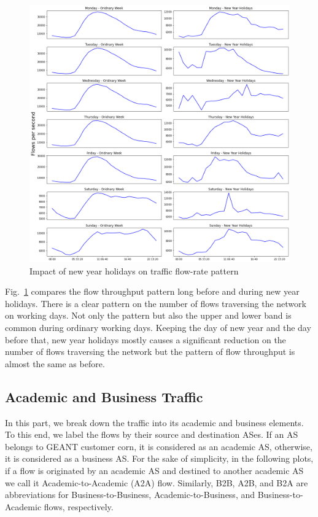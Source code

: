 \documentclass[10pt, journal, letterpaper]{IEEEtran}
\begin{document}
\begin{figure}
    \centering
    \includegraphics[width=\columnwidth]{img/OW_CH2_hourly_compare_fps.png}
    \caption{Impact of new year holidays on traffic flow-rate pattern}
    \label{fig:OW_CH2_hourly_fps}
\end{figure}
Fig.~\ref{fig:OW_CH2_hourly_fps} compares the flow throughput pattern long before and during new year holidays. There is a clear pattern on the number of flows traversing the network on working days. Not only the pattern but also the upper and lower band is common during ordinary working days. Keeping the day of new year and the day before that, new year holidays mostly causes a significant reduction on the number of flows traversing the network but the pattern of flow throughput is almost the same as before. 

\subsection{Academic and Business Traffic}
In this part, we break down the traffic into its academic and business elements. To this end, we label the flows by their source and destination ASes. If an AS belongs to GEANT customer corn, it is considered as an academic AS, otherwise, it is considered as a business AS. For the sake of simplicity, in the following plots, if a flow is originated by an academic AS and destined to another academic AS we call it Academic-to-Academic (A2A) flow. Similarly, B2B, A2B, and B2A are abbreviations for Business-to-Business, Academic-to-Business, and Business-to-Academic flows, respectively.
\end{document}
